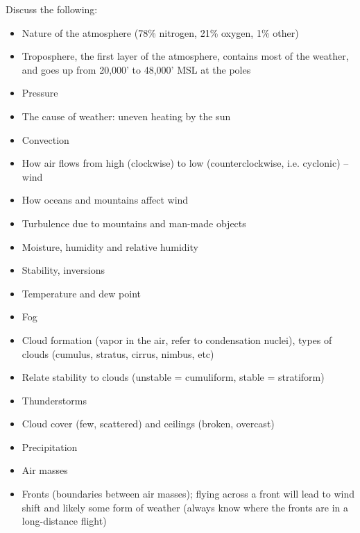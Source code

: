 \documentclass[twoside,openright]{report}
\begin{document}
Discuss the following:
\begin{itemize}
  \item Nature of the atmosphere (78\% nitrogen, 21\% oxygen, 1\% other)

  \item Troposphere, the first layer of the atmosphere, contains most of the
    weather, and goes up from 20,000' to 48,000' MSL at the poles

  \item Pressure

  \item The cause of weather: uneven heating by the sun

  \item Convection

  \item How air flows from high (clockwise) to low (counterclockwise, i.e.
    cyclonic) – wind

  \item How oceans and mountains affect wind

  \item Turbulence due to mountains and man-made objects

  \item Moisture, humidity and relative humidity

  \item Stability, inversions

  \item Temperature and dew point

  \item Fog

  \item Cloud formation (vapor in the air, refer to condensation nuclei), types
    of clouds (cumulus, stratus, cirrus, nimbus, etc)

  \item Relate stability to clouds (unstable = cumuliform, stable = stratiform)

  \item Thunderstorms

  \item Cloud cover (few, scattered) and ceilings (broken, overcast)

  \item Precipitation

  \item Air masses

  \item Fronts (boundaries between air masses); flying across a front will lead
    to wind shift and likely some form of weather (always know where the fronts
    are in a long-distance flight)


\end{itemize}
\end{document}
